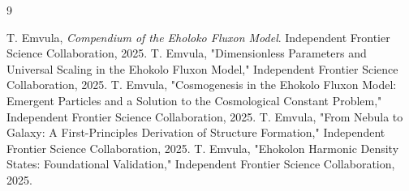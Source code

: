\documentclass[11pt, twoside]{article}
\begin{document}

\begin{thebibliography}{9}
\raggedright

 T. Emvula, \textit{Compendium of the Eholoko Fluxon Model}. Independent Frontier Science Collaboration, 2025.
 T. Emvula, "Dimensionless Parameters and Universal Scaling in the Ehokolo Fluxon Model," Independent Frontier Science Collaboration, 2025.
 T. Emvula, "Cosmogenesis in the Ehokolo Fluxon Model: Emergent Particles and a Solution to the Cosmological Constant Problem," Independent Frontier Science Collaboration, 2025.
 T. Emvula, "From Nebula to Galaxy: A First-Principles Derivation of Structure Formation," Independent Frontier Science Collaboration, 2025.
 T. Emvula, "Ehokolon Harmonic Density States: Foundational Validation," Independent Frontier Science Collaboration, 2025.

\end{thebibliography}
\end{document}
